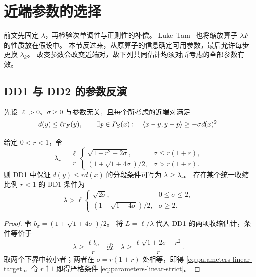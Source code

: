 \section{近端参数的选择}\label{sec:parameters}

前文先固定 $\lambda$，再检验次单调性与正则性的补偿。
Luke--Tam~\cite{LukeTam2025} 也将缩放算子 $\lambda F$ 的性质放在假设中。
本节反过来，从原算子的信息确定可用参数，最后允许每步更换 $\lambda_k$。
改变参数会改变近端对，故下列共同估计均须对所考虑的全部参数有效。

\subsection{DD1 与 DD2 的参数反演}

先设 $\ell>0$、$\sigma\ge0$ 与参数无关，且每个所考虑的近端对满足
\begin{equation}\label{eq:parameters-common-linear}
 d(y)\le\ell r_F(y),\qquad
 \exists p\in P_S(x):\quad\langle x-y,y-p\rangle\ge-\sigma d(x)^2.
\end{equation}

\begin{proposition}[DD1 的参数条件]\label{prop:parameters-dd1}
给定 $0<r<1$，令
\begin{equation}\label{eq:parameters-linear-target}
 \lambda_r=\frac\ell r
 \begin{cases}
 \sqrt{1-r^2+2\sigma},&\sigma\le r(1+r),\\[2pt]
 (1+\sqrt{1+4\sigma})/2,&\sigma>r(1+r).
 \end{cases}
\end{equation}
则 DD1 中保证 $d(y)\le r d(x)$ 的分段条件可写为 $\lambda\ge\lambda_r$。
存在某个统一收缩比例 $r<1$ 的 DD1 条件为
\begin{equation}\label{eq:parameters-linear-strict}
 \lambda>\ell
 \begin{cases}
 \sqrt{2\sigma},&0\le\sigma\le2,\\[2pt]
 (1+\sqrt{1+4\sigma})/2,&\sigma\ge2.
 \end{cases}
\end{equation}
\end{proposition}

\begin{proof}
令 $b_\sigma=(1+\sqrt{1+4\sigma})/2$。
将 $L=\ell/\lambda$ 代入 DD1 的两项收缩估计，条件等价于
\[
 \lambda\ge\frac{\ell b_\sigma}r
 \quad\text{或}\quad
 \lambda\ge\frac{\ell\sqrt{1+2\sigma-r^2}}r.
\]
取两个下界中较小者；两者在 $\sigma=r(1+r)$ 处相等，即得
\eqref{eq:parameters-linear-target}。令 $r\uparrow1$ 即得严格条件
\eqref{eq:parameters-linear-strict}。
\end{proof}


